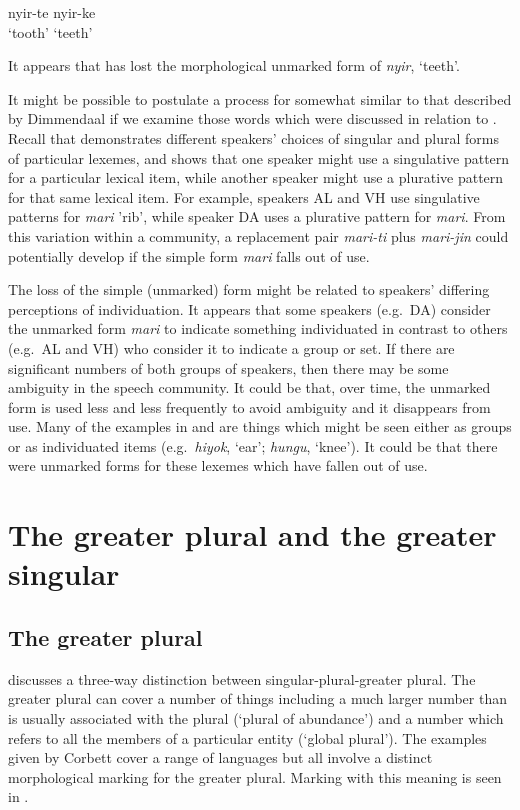 \documentclass[output=paper]{langsci/langscibook}
\begin{document}
\gll nyir-te nyir-ke \\
‘tooth’ ‘teeth’ \\
\z

It appears that  has lost the morphological unmarked form of \textit{nyir}, ‘teeth’. 

It might be possible to postulate a process for  somewhat similar to that described by Dimmendaal if we examine those words which were discussed in relation to . Recall that  demonstrates different speakers’ choices of singular and plural forms of particular lexemes, and shows that one speaker might use a singulative pattern for a particular lexical item, while another speaker might use a plurative pattern for that same lexical item. For example, speakers AL and VH use singulative patterns for \textit{mari} 'rib', while speaker DA uses a plurative pattern for \textit{mari}. From this variation within a community, a replacement pair \textit{mari-ti} plus \textit{mari-jin} could potentially develop if the simple form \textit{mari} falls out of use. 

The loss of the simple (unmarked) form might be related to speakers’ differing perceptions of individuation. It appears that some speakers (e.g.\ DA) consider the unmarked form \textit{mari }to indicate something individuated in contrast to others (e.g.\ AL and VH) who consider it to indicate a group or set. If there are significant numbers of both groups of speakers, then there may be some ambiguity in the speech community. It could be that, over time, the unmarked form is used less and less frequently to avoid ambiguity and it disappears from use. Many of the examples in  and  are things which might be seen either as groups or as individuated items (e.g.\ \textit{hiyok}, ‘ear’; \textit{hungu}, ‘knee’). It could be that there were unmarked forms for these lexemes which have fallen out of use.

\section{The greater plural and the greater singular} \label{sec:moodie:5}


\subsection{The greater plural} \label{sec:moodie:5.1}

\citet[30]{Corbett2000} discusses a three-way distinction between singular-plural-greater plural. The greater plural can cover a number of things including a much larger number than is usually associated with the plural (‘plural of abundance’) and a number which refers to all the members of a particular entity (‘global plural’). The examples given by Corbett cover a range of languages but all involve a distinct morphological marking for the greater plural. Marking with this meaning is seen in . 
\end{document}

